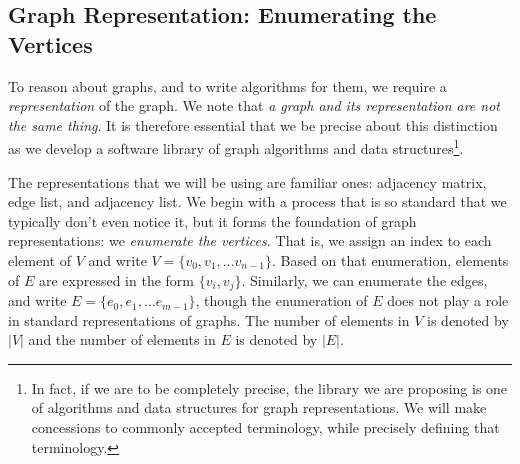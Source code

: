 \subsection{Graph Representation: Enumerating the Vertices}

To reason about graphs, and to write algorithms for them, we require a \emph{representation} of the graph.
We note that \emph{a graph and its representation are not the same thing}.  It is therefore essential
that we be precise about this distinction as we develop a software library of graph
algorithms and data structures\footnote{In fact, if we are to be completely precise, the library we are
proposing is one of algorithms and data structures for graph representations.  We will make concessions
to commonly accepted terminology, while precisely defining that terminology.}.

The representations that we will be using are familiar ones: adjacency matrix, edge list, and adjacency list.
We begin with a process that is so standard that we typically don't even notice it, but it forms
the foundation of graph representations: we \emph{enumerate the vertices.}  That is, we assign an
index to each element of $V$ and write $V = \{v_0, v_1, \ldots v_{n-1}\}$.  Based on that enumeration,
elements of $E$ are expressed in the form $\{v_i, v_j\}$.  Similarly, we can enumerate the edges, and write  
$E = \{ e_0, e_1, \ldots e_{m-1}\}$, though the enumeration of $E$ does not play a role in standard
representations of graphs.
%
The number of elements in $V$ is denoted by $|V|$ and the number of elements in $E$ is denoted by $|E|$.

